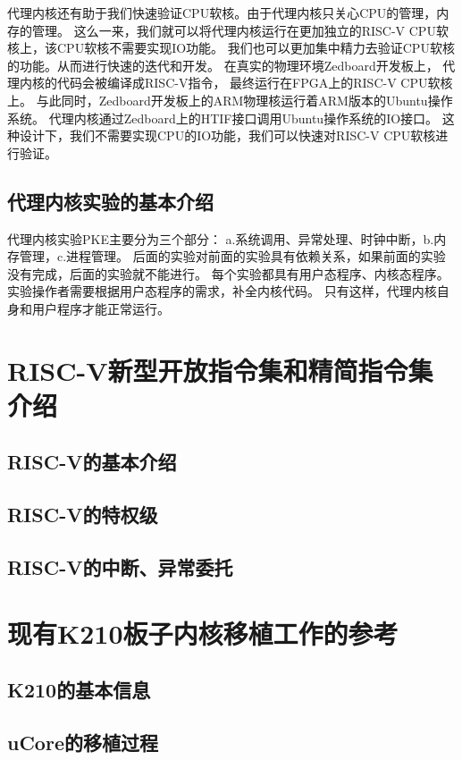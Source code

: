 代理内核还有助于我们快速验证CPU软核。由于代理内核只关心CPU的管理，内存的管理。
这么一来，我们就可以将代理内核运行在更加独立的RISC-V CPU软核上，该CPU软核不需要实现IO功能。
我们也可以更加集中精力去验证CPU软核的功能。从而进行快速的迭代和开发。
在真实的物理环境Zedboard开发板上，
代理内核的代码会被编译成RISC-V指令，
最终运行在FPGA上的RISC-V CPU软核上。
与此同时，Zedboard开发板上的ARM物理核运行着ARM版本的Ubuntu操作系统。
代理内核通过Zedboard上的HTIF接口调用Ubuntu操作系统的IO接口。
这种设计下，我们不需要实现CPU的IO功能，我们可以快速对RISC-V CPU软核进行验证。

\subsection{代理内核实验的基本介绍}

代理内核实验PKE主要分为三个部分：
a.系统调用、异常处理、时钟中断，b.内存管理，c.进程管理。
后面的实验对前面的实验具有依赖关系，如果前面的实验没有完成，后面的实验就不能进行。
每个实验都具有用户态程序、内核态程序。
实验操作者需要根据用户态程序的需求，补全内核代码。
只有这样，代理内核自身和用户程序才能正常运行。


\section{RISC-V新型开放指令集和精简指令集介绍}

\subsection{RISC-V的基本介绍}

\subsection{RISC-V的特权级}

\subsection{RISC-V的中断、异常委托}

\section{现有K210板子内核移植工作的参考}

\subsection{K210的基本信息}

\subsection{uCore的移植过程}

